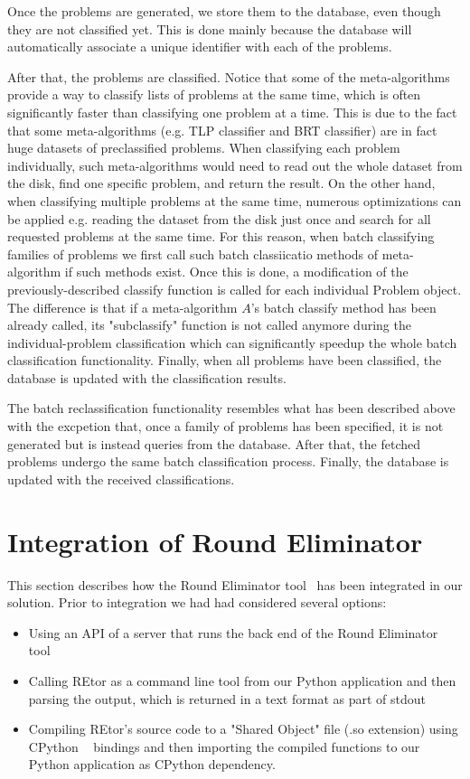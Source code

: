 Once the problems are generated, we store them to the database,
even though they are not classified yet. This is done mainly
because the database will automatically associate a unique
identifier with each of the problems.

After that, the problems are classified. Notice that
some of the meta-algorithms provide a way to classify
lists of problems at the same time, which is often
significantly faster than classifying one problem at a time.
This is due to the fact that some meta-algorithms
(e.g. TLP classifier and BRT classifier) are in fact
huge datasets of preclassified problems. When
classifying each problem individually, such
meta-algorithms would need to read out the whole
dataset from the disk, find one specific problem,
and return the result. On the other hand, when
classifying multiple problems at the same time,
numerous optimizations can be applied e.g. reading the 
dataset from the disk just once and search for all
requested problems at the same time. For this reason,
when batch classifying families of problems we first
call such batch classiicatio methods of meta-algorithm
if such methods exist. Once this is done, a modification
of the previously-described classify function is called
for each individual Problem object. The difference is
that if a meta-algorithm $A$'s batch classify method has been
already called, its "subclassify" function is not called
anymore during the individual-problem classification which
can significantly speedup the whole batch classification
functionality. Finally, when all problems have been classified,
the database is updated with the classification results.

The batch reclassification functionality resembles
what has been described above with the excpetion that,
once a family of problems has been specified, it is
not generated but is instead queries from the database.
After that, the fetched problems undergo the same
batch classification process. Finally, the database is
updated with the received classifications.

\section{Integration of Round Eliminator}

This section describes how the Round Eliminator
tool~\cite{FIXME} has been integrated in our solution.
Prior to integration we had had considered several options:

\begin{itemize}
  \item Using an API of a server that runs the back end of the Round Eliminator tool
  \item Calling REtor as a command line tool from our Python
  application and then parsing the output, which is returned
  in a text format as part of stdout~\cite{FIXME}
  \item Compiling REtor's source code to a "Shared Object" file (.so extension)
  using CPython ~\cite{FIXME} bindings and then importing the compiled
  functions to our Python application as CPython dependency.
\end{itemize}


